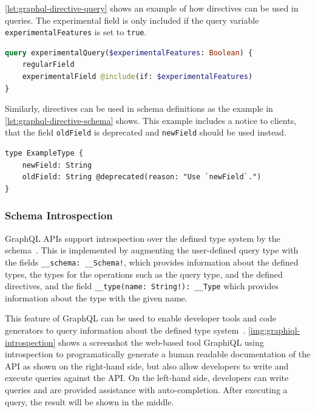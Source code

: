 \autoref{lst:graphql-directive-query} shows an example of how directives can be used in queries.
The experimental field is only included if the query variable \texttt{experimentalFeatures} is set to \texttt{true}.

\begin{lstlisting}[caption={Usage of a Directive in a GraphQL Query}, language=graphql, label={lst:graphql-directive-query}]
query experimentalQuery($experimentalFeatures: Boolean) {
    regularField
    experimentalField @include(if: $experimentalFeatures)
}
\end{lstlisting}

Similarly, directives can be used in schema definitions as the example in \autoref{lst:graphql-directive-schema} shows.
This example includes a notice to clients, that the field \texttt{oldField} is deprecated and \texttt{newField} should be used instead.

\begin{lstlisting}[caption={Usage of a Directive in a GraphQL Schema~\cite{Facebook2018}}, language=graphqls, label={lst:graphql-directive-schema}]
type ExampleType {
    newField: String
    oldField: String @deprecated(reason: "Use `newField`.")
}
\end{lstlisting}

\subsubsection{Schema Introspection}

GraphQL \acp{API} support introspection over the defined type system by the schema~\cite{Facebook2018}.
This is implemented by augmenting the user-defined query type with the fields \texttt{\_\_schema: \_\_Schema!}, which provides information about the defined types, the types for the operations such as the query type, and the defined directives, and the field \texttt{\_\_type(name: String!): \_\_Type} which provides information about the type with the given name.

This feature of GraphQL can be used to enable developer tools and code generators to query information about the defined type system~\cite{Touronen2019}.
\autoref{img:graphiql-introspection} shows a screenshot the web-based tool GraphiQL using introspection to programatically generate a human readable documentation of the \ac{API} as shown on the right-hand side, but also allow developers to write and execute queries against the \ac{API}.
On the left-hand side, developers can write queries and are provided assistance with auto-completion.
After executing a query, the result will be shown in the middle.

